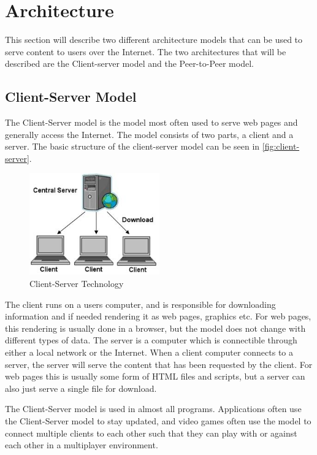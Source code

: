 \section{Architecture}
\label{sec:architecture}

This section will describe two different architecture models that can be used to serve content to users over the Internet. The two architectures that will be described are the Client-server model and the Peer-to-Peer model.

\subsection{Client-Server Model}
The Client-Server model is the model most often used to serve web pages and generally access the Internet. The model consists of two parts, a client and a server.
The basic structure of the client-server model can be seen in \autoref{fig:client-server}.

\begin{figure}[ht]
  \centering
    \includegraphics[width=0.5\textwidth]{img/client_server.jpg}
  \caption{Client-Server Technology \citep{ClientServer}}
  \label{fig:client-server}
\end{figure}

The client runs on a users computer, and is responsible for downloading information and if needed rendering it as web pages, graphics etc. For web pages, this rendering is usually done in a browser, but the model does not change with different types of data.
The server is a computer which is connectible through either a local network or the Internet. When a client computer connects to a server, the server will serve the content that has been requested by the client. For web pages this is usually some form of HTML files and scripts, but a server can also just serve a single file for download.

The Client-Server model is used in almost all programs. Applications often use the Client-Server model to stay updated, and video games often use the model to connect multiple clients to each other such that they can play with or against each other in a multiplayer environment.

